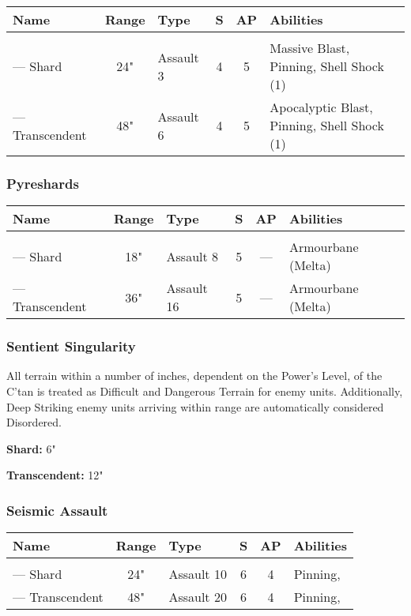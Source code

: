 \noindent
\begin{NiceTabular}{L{115 pt} c C{40pt} *{2}{c} >{\raggedright\arraybackslash}p{240pt}}
	Name & Range & Type & S & AP & Abilities \\
	\hline
	 &  &  &  &  & \\
	— Shard & 24" & Assault 3 & 4 & 5 & Massive Blast, Pinning, Shell Shock (1) \\
	 — Transcendent & 48" & Assault 6 & 4 & 5 & Apocalyptic Blast, Pinning, Shell Shock (1) \\
\end{NiceTabular}

\subsubsection{Pyreshards} \label{Pyreshards}

\noindent
\begin{NiceTabular}{L{115 pt} c C{40pt} *{2}{c} >{\raggedright\arraybackslash}p{240pt}}
	Name & Range & Type & S & AP & Abilities \\
	\hline
	 &  &  &  &  & \\
	— Shard & 18" & Assault 8 & 5 & — & Armourbane (Melta) \\
	 — Transcendent  & 36" & Assault 16 & 5 & — & Armourbane (Melta) \\
\end{NiceTabular}

\subsubsection{Sentient Singularity} \label{Sentient Singularity}

All terrain within a number of inches, dependent on the Power's Level, of the C'tan is treated as Difficult and Dangerous Terrain for enemy units. Additionally, Deep Striking enemy units arriving within range are automatically considered Disordered.

\textbf{Shard:} 6"

\textbf{Transcendent:} 12"

\subsubsection{Seismic Assault} \label{Seismic Assault}

\noindent
\begin{NiceTabular}{L{115 pt} c C{40pt} *{2}{c} >{\raggedright\arraybackslash}p{240pt}}
	Name & Range & Type & S & AP & Abilities \\
	\hline
	 &  &  &  &  & \\
	— Shard & 24" & Assault 10 & 6 & 4 & Pinning,  \\
	 — Transcendent & 48" & Assault 20 & 6 & 4 & Pinning,  \\
\end{NiceTabular}

